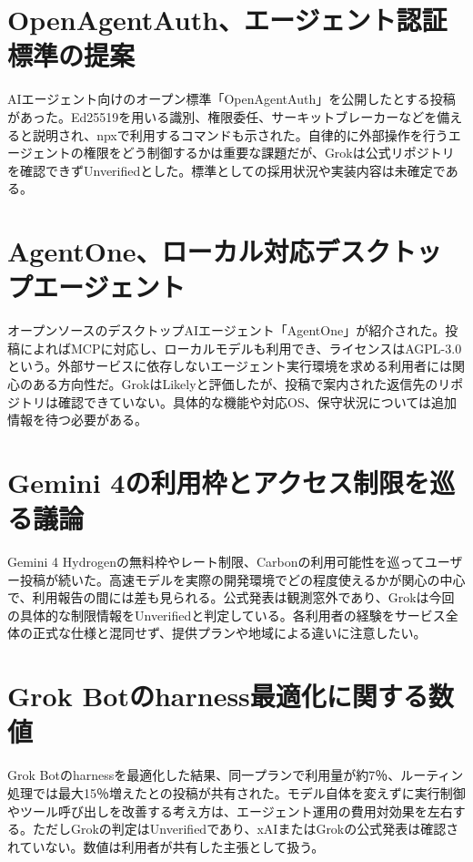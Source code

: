 \section{OpenAgentAuth、エージェント認証標準の提案}
AIエージェント向けのオープン標準「OpenAgentAuth」を公開したとする投稿があった。Ed25519を用いる識別、権限委任、サーキットブレーカーなどを備えると説明され、npxで利用するコマンドも示された。自律的に外部操作を行うエージェントの権限をどう制御するかは重要な課題だが、Grokは公式リポジトリを確認できずUnverifiedとした。標準としての採用状況や実装内容は未確定である。

\section{AgentOne、ローカル対応デスクトップエージェント}
オープンソースのデスクトップAIエージェント「AgentOne」が紹介された。投稿によればMCPに対応し、ローカルモデルも利用でき、ライセンスはAGPL-3.0という。外部サービスに依存しないエージェント実行環境を求める利用者には関心のある方向性だ。GrokはLikelyと評価したが、投稿で案内された返信先のリポジトリは確認できていない。具体的な機能や対応OS、保守状況については追加情報を待つ必要がある。

\section{Gemini 4の利用枠とアクセス制限を巡る議論}
Gemini 4 Hydrogenの無料枠やレート制限、Carbonの利用可能性を巡ってユーザー投稿が続いた。高速モデルを実際の開発環境でどの程度使えるかが関心の中心で、利用報告の間には差も見られる。公式発表は観測窓外であり、Grokは今回の具体的な制限情報をUnverifiedと判定している。各利用者の経験をサービス全体の正式な仕様と混同せず、提供プランや地域による違いに注意したい。

\section{Grok Botのharness最適化に関する数値}
Grok Botのharnessを最適化した結果、同一プランで利用量が約7％、ルーティン処理では最大15％増えたとの投稿が共有された。モデル自体を変えずに実行制御やツール呼び出しを改善する考え方は、エージェント運用の費用対効果を左右する。ただしGrokの判定はUnverifiedであり、xAIまたはGrokの公式発表は確認されていない。数値は利用者が共有した主張として扱う。

